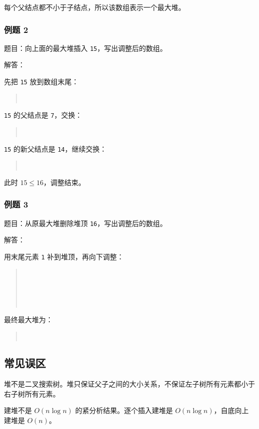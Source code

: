 \documentclass[UTF8,zihao=-4]{ctexart}
\begin{document}
每个父结点都不小于子结点，所以该数组表示一个最大堆。

\subsubsection*{例题 2}

题目：向上面的最大堆插入 \texttt{15}，写出调整后的数组。

解答：

先把 \texttt{15} 放到数组末尾：

\begin{quote}
\small\ttfamily\raggedright
\relax [16,\ 14,\ 10,\ 8,\ 7,\ 9,\ 3,\ 2,\ 4,\ 1,\ 15]\\
\end{quote}

\texttt{15} 的父结点是 \texttt{7}，交换：

\begin{quote}
\small\ttfamily\raggedright
\relax [16,\ 14,\ 10,\ 8,\ 15,\ 9,\ 3,\ 2,\ 4,\ 1,\ 7]\\
\end{quote}

\texttt{15} 的新父结点是 \texttt{14}，继续交换：

\begin{quote}
\small\ttfamily\raggedright
\relax [16,\ 15,\ 10,\ 8,\ 14,\ 9,\ 3,\ 2,\ 4,\ 1,\ 7]\\
\end{quote}

此时 $15 \le 16$，调整结束。

\subsubsection*{例题 3}

题目：从原最大堆删除堆顶 \texttt{16}，写出调整后的数组。

解答：

用末尾元素 \texttt{1} 补到堆顶，再向下调整：

\begin{quote}
\small\ttfamily\raggedright
\relax [1,\ 14,\ 10,\ 8,\ 7,\ 9,\ 3,\ 2,\ 4]\\
\relax [14,\ 1,\ 10,\ 8,\ 7,\ 9,\ 3,\ 2,\ 4]\\
\relax [14,\ 8,\ 10,\ 1,\ 7,\ 9,\ 3,\ 2,\ 4]\\
\relax [14,\ 8,\ 10,\ 4,\ 7,\ 9,\ 3,\ 2,\ 1]\\
\end{quote}

最终最大堆为：

\begin{quote}
\small\ttfamily\raggedright
\relax [14,\ 8,\ 10,\ 4,\ 7,\ 9,\ 3,\ 2,\ 1]\\
\end{quote}

\subsection*{常见误区}

堆不是二叉搜索树。堆只保证父子之间的大小关系，不保证左子树所有元素都小于右子树所有元素。

建堆不是 $O(n \log n)$ 的紧分析结果。逐个插入建堆是 $O(n \log n)$，自底向上建堆是 $O(n)$。
\end{document}
